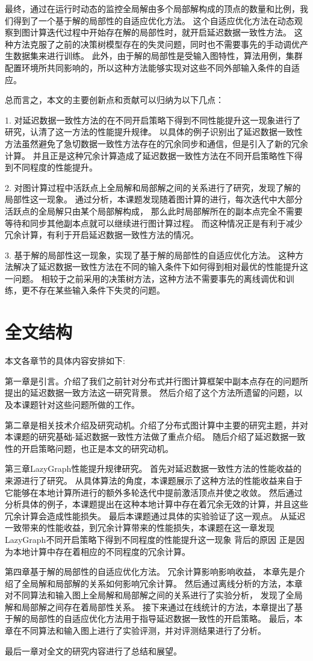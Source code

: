 最终，通过在运行时动态的监控全局解由多个局部解构成的顶点的数量和比例，我们得到了一个基于解的局部性的自适应优化方法。
这个自适应优化方法在动态观察到图计算迭代过程中开始存在解的局部性时，就开启延迟数据一致性方法。
这种方法克服了之前的决策树模型存在的失灵问题，同时也不需要事先的手动调优产生数据集来进行训练。
此外，由于解的局部性是受输入图特性，算法用例，集群配置环境所共同影响的，所以这种方法能够实现对这些不同外部输入条件的自适应。

总而言之，本文的主要创新点和贡献可以归纳为以下几点：

1. 对延迟数据一致性方法的在不同开启策略下得到不同性能提升这一现象进行了研究，认清了这一方法的性能提升规律。
以具体的例子识别出了延迟数据一致性方法虽然避免了急切数据一致性方法存在的冗余同步和通信，但是引入了新的冗余计算。
并且正是这种冗余计算造成了延迟数据一致性方法在不同开启策略性下得到不同程度的性能提升。

2. 对图计算过程中活跃点上全局解和局部解之间的关系进行了研究，发现了解的局部性这一现象。
通过分析，本课题发现随着图计算的进行，每次迭代中大部分活跃点的全局解只由某个局部解构成，
那么此时局部解所在的副本点完全不需要等待和同步其他副本点就可以继续进行图计算过程。
而这种情况正是有利于减少冗余计算，有利于开启延迟数据一致性方法的情况。

3. 基于解的局部性这一现象，实现了基于解的局部性的自适应优化方法。
这种方法解决了延迟数据一致性方法在不同的输入条件下如何得到相对最优的性能提升这一问题。
相较于之前采用的决策树方法，这种方法不需要事先的离线调优和训练，更不存在某些输入条件下失灵的问题。




\section{全文结构}
本文各章节的具体内容安排如下:

第一章是引言。介绍了我们之前针对分布式并行图计算框架中副本点存在的问题所提出的延迟数据一致方法这一研究背景。
然后介绍了这个方法所遗留的问题，以及本课题针对这些问题所做的工作。

第二章是相关技术介绍及研究动机。介绍了分布式图计算中主要的研究主题，并对本课题的研究基础-延迟数据一致性方法做了重点介绍。
随后介绍了延迟数据一致性的开启策略问题，也正是本文的研究动机。

第三章LazyGraph性能提升规律研究。
首先对延迟数据一致性方法的性能收益的来源进行了研究。
从具体算法的角度，本课题展示了这种方法的性能收益来自于 它能够在本地计算所进行的额外多轮迭代中提前激活顶点并使之收敛。
然后通过分析具体的例子，本课题提出在这种本地计算中存在着冗余无效的计算，并且这些冗余计算会造成性能损失。
最后本课题通过具体的实验验证了这一观点。
从延迟一致带来的性能收益，到冗余计算带来的性能损失，本课题在这一章发现LazyGraph不同开启策略下得到不同程度的性能提升这一现象
背后的原因
正是因为本地计算中存在着相应的不同程度的冗余计算。

第四章基于解的局部性的自适应优化方法。
冗余计算影响影响收益，
本章先是介绍了全局解和局部解的关系如何影响冗余计算。
然后通过离线分析的方法，本章对不同算法和输入图上全局解和局部解之间的关系进行了实验分析，
发现了全局解和局部解之间存在着局部性关系。
接下来通过在线统计的方法，本章提出了基于解的局部性的自适应优化方法用于指导延迟数据一致性的开启策略。
最后，本章在不同算法和输入图上进行了实验评测，并对评测结果进行了分析。

最后一章对全文的研究内容进行了总结和展望。




